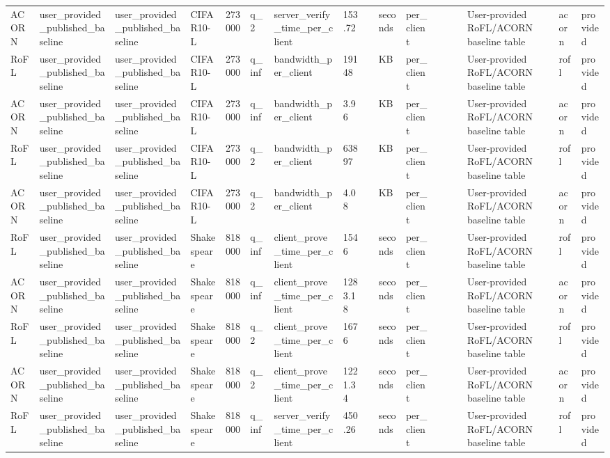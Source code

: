 \begin{table}[t]
\begin{tabular}{lllllllllllllllll}
ACORN & user\_provided\_published\_baseline & user\_provided\_published\_baseline & CIFAR10-L & 273000 & q\_2 & server\_verify\_time\_per\_client & 153.72 &  & seconds & per\_client &  &  &  & User-provided RoFL/ACORN baseline table & acorn & provided \\
RoFL & user\_provided\_published\_baseline & user\_provided\_published\_baseline & CIFAR10-L & 273000 & q\_inf & bandwidth\_per\_client & 19148 &  & KB & per\_client &  &  &  & User-provided RoFL/ACORN baseline table & rofl & provided \\
ACORN & user\_provided\_published\_baseline & user\_provided\_published\_baseline & CIFAR10-L & 273000 & q\_inf & bandwidth\_per\_client & 3.96 &  & KB & per\_client &  &  &  & User-provided RoFL/ACORN baseline table & acorn & provided \\
RoFL & user\_provided\_published\_baseline & user\_provided\_published\_baseline & CIFAR10-L & 273000 & q\_2 & bandwidth\_per\_client & 63897 &  & KB & per\_client &  &  &  & User-provided RoFL/ACORN baseline table & rofl & provided \\
ACORN & user\_provided\_published\_baseline & user\_provided\_published\_baseline & CIFAR10-L & 273000 & q\_2 & bandwidth\_per\_client & 4.08 &  & KB & per\_client &  &  &  & User-provided RoFL/ACORN baseline table & acorn & provided \\
RoFL & user\_provided\_published\_baseline & user\_provided\_published\_baseline & Shakespeare & 818000 & q\_inf & client\_prove\_time\_per\_client & 1546 &  & seconds & per\_client &  &  &  & User-provided RoFL/ACORN baseline table & rofl & provided \\
ACORN & user\_provided\_published\_baseline & user\_provided\_published\_baseline & Shakespeare & 818000 & q\_inf & client\_prove\_time\_per\_client & 1283.18 &  & seconds & per\_client &  &  &  & User-provided RoFL/ACORN baseline table & acorn & provided \\
RoFL & user\_provided\_published\_baseline & user\_provided\_published\_baseline & Shakespeare & 818000 & q\_2 & client\_prove\_time\_per\_client & 1676 &  & seconds & per\_client &  &  &  & User-provided RoFL/ACORN baseline table & rofl & provided \\
ACORN & user\_provided\_published\_baseline & user\_provided\_published\_baseline & Shakespeare & 818000 & q\_2 & client\_prove\_time\_per\_client & 1221.34 &  & seconds & per\_client &  &  &  & User-provided RoFL/ACORN baseline table & acorn & provided \\
RoFL & user\_provided\_published\_baseline & user\_provided\_published\_baseline & Shakespeare & 818000 & q\_inf & server\_verify\_time\_per\_client & 450.26 &  & seconds & per\_client &  &  &  & User-provided RoFL/ACORN baseline table & rofl & provided \\

\end{tabular}
\end{table}
